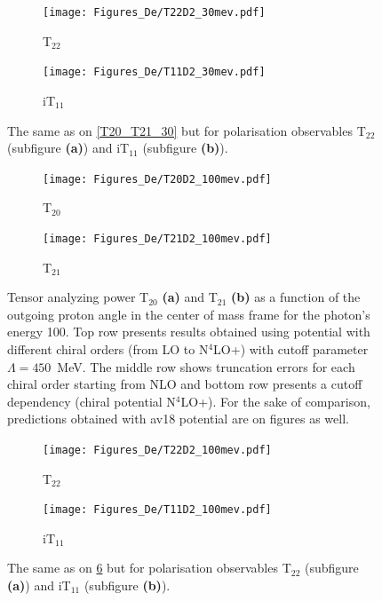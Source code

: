     \begin{figure}[htb]
        \centering
        \begin{subfigure}[b]{0.46\textwidth}
            \texttt{[image: Figures\_De/T22D2\_30mev.pdf]}
            \caption{T$_{22}$}
            \label{T22_30_vert}
        \end{subfigure}
        \begin{subfigure}[b]{0.46\textwidth}
            \texttt{[image: Figures\_De/T11D2\_30mev.pdf]}
            \caption{iT$_{11}$}
            \label{T11_30_vert}
        \end{subfigure}
        \caption{The same as on \ref{T20_T21_30} but for polarisation observables
        T$_{22}$ (subfigure {\bf (a)}) and iT$_{11}$ (subfigure {\bf (b)}).}
        \label{T22_T11_30}
    \end{figure}

    \begin{figure}[htb]
        \centering
        \begin{subfigure}[b]{0.46\textwidth}
            \texttt{[image: Figures\_De/T20D2\_100mev.pdf]}
            \caption{T$_{20}$}
            \label{T20_100_vert}
        \end{subfigure}
        \begin{subfigure}[b]{0.46\textwidth}
            \texttt{[image: Figures\_De/T21D2\_100mev.pdf]}
            \caption{T$_{21}$}
            \label{T21_100_vert}
        \end{subfigure}
        \caption{Tensor analyzing power T$_{20}$  {\bf (a)}
        and T$_{21}$ {\bf (b)}
        as a function of the outgoing proton angle in the center of mass frame 
        for the photon's energy \SI{100}{\mev}.
        Top row presents results obtained using potential
        with different chiral orders (from LO to N$^4$LO+) with cutoff parameter $\Lambda=450$~MeV.
        The middle row shows truncation errors for each 
        chiral order starting from NLO and
        bottom row presents a cutoff dependency (chiral potential N$^4$LO+).
        For the sake of comparison, predictions obtained with \gls*{av18} potential are on figures as well.}
        \label{T20_T21_100}
    \end{figure}

    \begin{figure}[htb]
        \centering
        \begin{subfigure}[b]{0.46\textwidth}
            \texttt{[image: Figures\_De/T22D2\_100mev.pdf]}
            \caption{T$_{22}$}
            \label{T22_100_vert}
        \end{subfigure}
        \begin{subfigure}[b]{0.46\textwidth}
            \texttt{[image: Figures\_De/T11D2\_100mev.pdf]}
            \caption{iT$_{11}$}
            \label{T11_100_vert}
        \end{subfigure}
        \caption{The same as on \ref{T20_T21_100} but for polarisation observables
        T$_{22}$ (subfigure {\bf (a)}) and iT$_{11}$ (subfigure {\bf (b)}).}
        \label{T22_T11_100}
    \end{figure}

